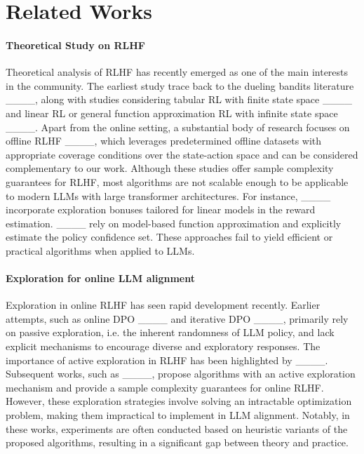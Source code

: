\section{Related Works}
\paragraph{Theoretical Study on RLHF}
Theoretical analysis of RLHF has recently emerged as one of the main interests in the community. 
The earliest study trace back to the dueling bandits literature ____, along with studies considering tabular RL with finite state space ____ and linear RL or general function approximation RL with infinite state space ____. 
Apart from the online setting, a substantial body of research focuses on offline RLHF ____, which leverages predetermined offline datasets with appropriate coverage conditions over the state-action space and can be considered complementary to our work.
Although these studies offer sample complexity guarantees for RLHF, most algorithms are not scalable enough to be applicable to modern LLMs with large transformer architectures.
For instance, ____ incorporate exploration bonuses tailored for linear models in the reward estimation.
____ rely on model-based function approximation and explicitly estimate the policy confidence set. These approaches fail to yield efficient or practical algorithms when applied to LLMs.


\paragraph{Exploration for online LLM alignment}
Exploration in online RLHF has seen rapid development recently.
Earlier attempts, such as online DPO ____ and iterative DPO ____, primarily rely on passive exploration, i.e. the inherent randomness of LLM policy, and lack explicit mechanisms to encourage diverse and exploratory responses.
The importance of active exploration in RLHF has been highlighted by ____. 
Subsequent works, such as ____, propose algorithms with an active exploration mechanism and provide a sample complexity guarantees for online RLHF.
However, these exploration strategies involve solving an intractable optimization problem, making them impractical to implement in LLM alignment. 
Notably, in these works, experiments are often conducted based on heuristic variants of the proposed algorithms, resulting in a significant gap between theory and practice.

